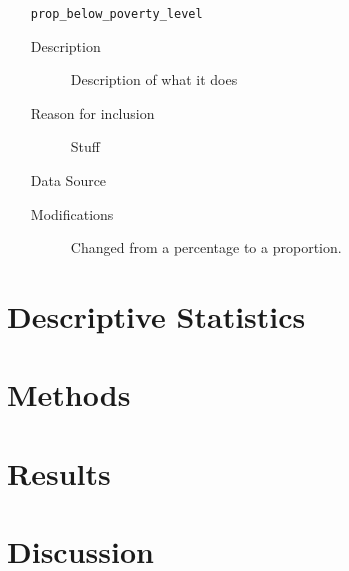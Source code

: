 \documentclass{article}
\begin{document}
\begin{itemize}[label={}, align=left]
\begin{description}
          \end{description}
    \item[\texttt{prop\_below\_poverty\_level}] \
          \begin{description}
              \item[Description] Description of what it does
              \item[Reason for inclusion] Stuff
              \item[Data Source] \cite{acs_poverty_data}
              \item[Modifications] Changed from a percentage to a proportion.
          \end{description}
\end{itemize}

\section{Descriptive Statistics}
\section{Methods}
\section{Results}
\section{Discussion}

\printbibliography
\end{document}
